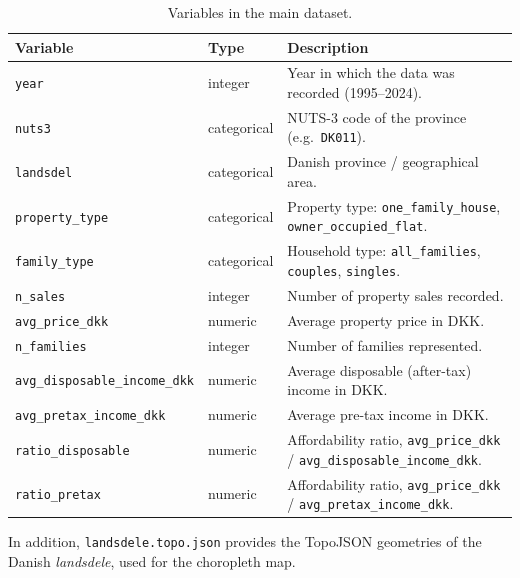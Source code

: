 \begin{table}[H]
\centering
\caption{Variables in the main dataset.}
\label{tab:variables}
\begin{tabularx}{\textwidth}{@{}l l X@{}}
\toprule
\textbf{Variable} & \textbf{Type} & \textbf{Description} \\
\midrule
\texttt{year}          & integer     & Year in which the data was recorded (1995--2024). \\
\texttt{nuts3}         & categorical & NUTS-3 code of the province (e.g.\ \texttt{DK011}). \\
\texttt{landsdel}      & categorical & Danish province / geographical area. \\
\texttt{property\_type}& categorical & Property type: \texttt{one\_family\_house}, \texttt{owner\_occupied\_flat}. \\
\texttt{family\_type}  & categorical & Household type: \texttt{all\_families}, \texttt{couples}, \texttt{singles}. \\
\texttt{n\_sales}      & integer     & Number of property sales recorded. \\
\texttt{avg\_price\_dkk}& numeric    & Average property price in DKK. \\
\texttt{n\_families}   & integer     & Number of families represented. \\
\texttt{avg\_disposable\_\allowbreak{}income\_dkk}& numeric & Average disposable (after-tax) income in DKK. \\
\texttt{avg\_pretax\_\allowbreak{}income\_dkk}& numeric & Average pre-tax income in DKK. \\
\texttt{ratio\_disposable}& numeric  & Affordability ratio, \texttt{avg\_price\_dkk} / \texttt{avg\_disposable\_income\_dkk}. \\
\texttt{ratio\_pretax} & numeric     & Affordability ratio, \texttt{avg\_price\_dkk} / \texttt{avg\_pretax\_income\_dkk}. \\
\bottomrule
\end{tabularx}
\end{table}

\noindent In addition, \texttt{landsdele.topo.json} provides the TopoJSON geometries of the Danish \emph{landsdele}, used for the choropleth map.

